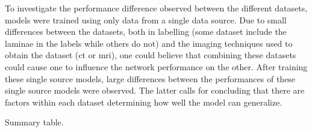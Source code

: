 \par{
    To investigate the performance difference observed between the different datasets, models were trained using only data from a single data source.
    Due to small differences between the datasets, both in labelling (some dataset include the laminae in the labels while others do not) and the imaging techniques used to obtain the dataset (\acrshort{ct} or \acrshort{mri}),
    one could believe that combining these datasets could cause one to influence the network performance on the other.
    After training these single source models, large differences between the performances of these single source models were observed.
    The latter calls for concluding that there are factors within each dataset determining how well the model can generalize.
}

\begin{table}

    
    \caption{Summary table.
    }

\end{table}

